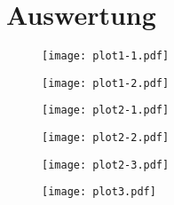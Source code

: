 \section{Auswertung}
\label{sec:Auswertung}

\begin{table}
  \centering
  \label{tab:messwerte}
\end{table}
\begin{figure}
  \texttt{[image: plot1-1.pdf]}
\end{figure}
\begin{figure}
  \texttt{[image: plot1-2.pdf]}
\end{figure}
\begin{figure}
  \texttt{[image: plot2-1.pdf]}
\end{figure}
\begin{figure}
  \texttt{[image: plot2-2.pdf]}
\end{figure}
\begin{figure}
  \texttt{[image: plot2-3.pdf]}
\end{figure}
\begin{figure}
  \texttt{[image: plot3.pdf]}
\end{figure}


